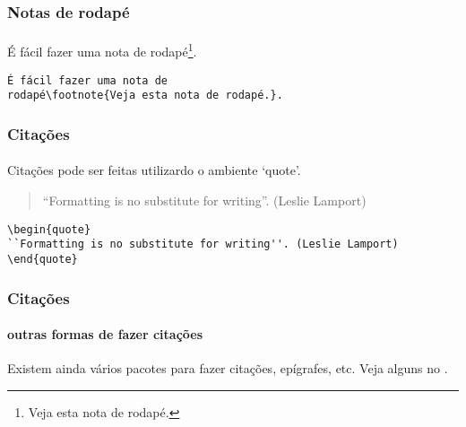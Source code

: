 \begin{frame}[fragile]
\frametitle{Notas de rodapé}
\framesubtitle{}
É fácil fazer uma nota de rodapé\footnote{Veja esta nota de rodapé.}.

\begin{verbatim}
É fácil fazer uma nota de 
rodapé\footnote{Veja esta nota de rodapé.}.
\end{verbatim}
\end{frame}

\begin{frame}[fragile]
\frametitle{Citações}
\framesubtitle{}
Citações pode ser feitas utilizardo o ambiente `quote'.
\begin{quote}
``Formatting is no substitute for writing''. (Leslie Lamport)
\end{quote}

\begin{scriptsize}
\begin{verbatim}
\begin{quote}
``Formatting is no substitute for writing''. (Leslie Lamport)
\end{quote}
\end{verbatim}
\end{scriptsize}
\end{frame}

\begin{frame}[fragile]
\frametitle{Citações}
\framesubtitle{outras formas de fazer citações}

Existem ainda vários pacotes para fazer citações, epígrafes, etc.
Veja alguns no .
\end{frame}
